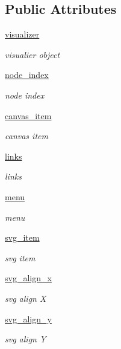\subsection*{Public Attributes}
\begin{DoxyCompactItemize}
\item 
\hyperlink{classvisualizer_1_1core_1_1Node_a0a496e48f933bd1b1abb6bfaf0c35697}{visualizer}
\begin{DoxyCompactList}\small\item\em visualier object \end{DoxyCompactList}\item 
\hyperlink{classvisualizer_1_1core_1_1Node_aea81fec6a912dca8f7c389ed7cb37008}{node\+\_\+index}
\begin{DoxyCompactList}\small\item\em node index \end{DoxyCompactList}\item 
\hyperlink{classvisualizer_1_1core_1_1Node_ae4f6e3fb5cb20aaa464382bfcbc0294b}{canvas\+\_\+item}
\begin{DoxyCompactList}\small\item\em canvas item \end{DoxyCompactList}\item 
\hyperlink{classvisualizer_1_1core_1_1Node_a7dcb0e2fa8317412908cb5c570bad29a}{links}
\begin{DoxyCompactList}\small\item\em links \end{DoxyCompactList}\item 
\hyperlink{classvisualizer_1_1core_1_1Node_a76954e2bc7108000f628d4f80587f2bb}{menu}
\begin{DoxyCompactList}\small\item\em menu \end{DoxyCompactList}\item 
\hyperlink{classvisualizer_1_1core_1_1Node_a8fc37475251336b56578ff3a5d437ba3}{svg\+\_\+item}
\begin{DoxyCompactList}\small\item\em svg item \end{DoxyCompactList}\item 
\hyperlink{classvisualizer_1_1core_1_1Node_ad50b46d4bbfd1065c56be43a328291dc}{svg\+\_\+align\+\_\+x}
\begin{DoxyCompactList}\small\item\em svg align X \end{DoxyCompactList}\item 
\hyperlink{classvisualizer_1_1core_1_1Node_a036f5bf15b16736492f193745451a2af}{svg\+\_\+align\+\_\+y}
\begin{DoxyCompactList}\small\item\em svg align Y \end{DoxyCompactList}\end{DoxyCompactItemize}
